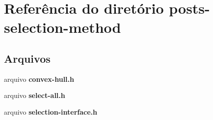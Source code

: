 \section{Referência do diretório posts-\/selection-\/method}
\label{dir_51fdc8f8aaeb5187b9842d8c17ca3f9e}
\subsection*{Arquivos}
\begin{DoxyCompactItemize}
\item 
arquivo {\bf convex-\/hull.\+h}
\item 
arquivo {\bf select-\/all.\+h}
\item 
arquivo {\bf selection-\/interface.\+h}
\end{DoxyCompactItemize}
